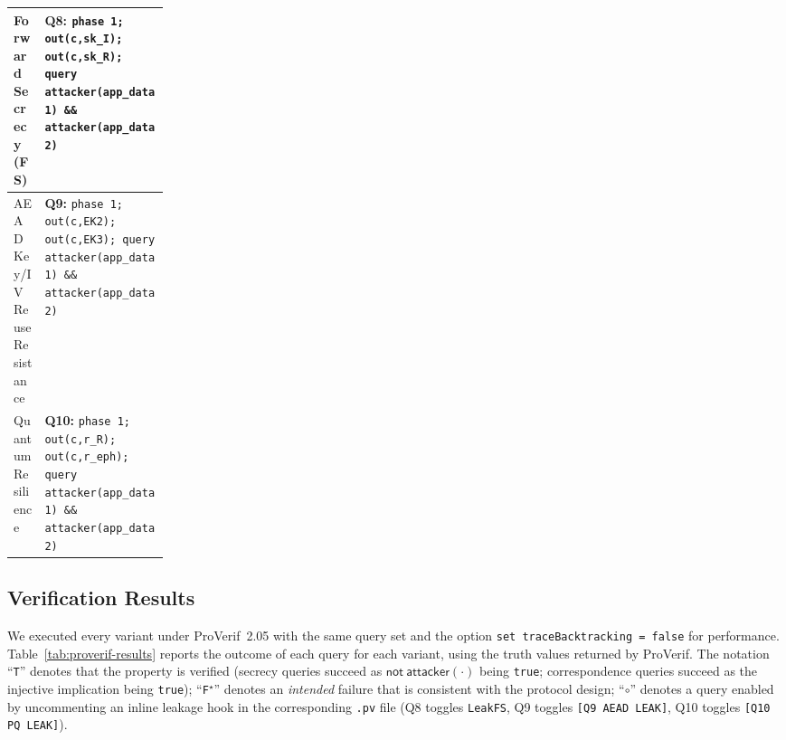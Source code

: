 \documentclass{easychair}
\begin{document}
\begin{table}[t]
\begin{tabularx}{\linewidth}{%
  >{\raggedright\arraybackslash}p{0.20\linewidth}
  >{\raggedright\arraybackslash}X}
Forward Secrecy (FS) &
\textbf{Q8:} \texttt{phase 1; out(c,sk\_I); out(c,sk\_R); query
attacker(app\_data1) \&\& attacker(app\_data2)} \\
\cmidrule(lr){1-2}

AEAD Key/IV Reuse Resistance &
\textbf{Q9:} \texttt{phase 1; out(c,EK2); out(c,EK3); query
attacker(app\_data1) \&\& attacker(app\_data2)} \\
\cmidrule(lr){1-2}

Quantum Resilience &
\textbf{Q10:} \texttt{phase 1; out(c,r\_R); out(c,r\_eph); query
attacker(app\_data1) \&\& attacker(app\_data2)} \\
\bottomrule
\end{tabularx}
\end{table}

\subsection{Verification Results}
We executed every variant under ProVerif~2.05 with the same query set
and the option \texttt{set traceBacktracking = false} for performance.
Table~\ref{tab:proverif-results} reports the outcome of each query for
each variant, using the truth values returned by ProVerif. The notation
``\texttt{T}'' denotes that the property is verified (secrecy queries
succeed as $\mathsf{not\ attacker(\cdot)}$ being \texttt{true};
correspondence queries succeed as the injective implication being
\texttt{true}); ``\texttt{F$^\star$}'' denotes an \emph{intended}
failure that is consistent with the protocol design; ``$\circ$'' denotes
a query enabled by uncommenting an inline leakage hook in the
corresponding \texttt{.pv} file (Q8 toggles \texttt{LeakFS}, Q9 toggles
\texttt{[Q9 AEAD LEAK]}, Q10 toggles \texttt{[Q10 PQ LEAK]}).
\end{document}
